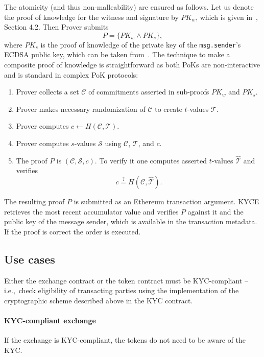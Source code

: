 The atomicity (and thus non-malleability) are ensured as follows. Let us denote the
proof of knowledge for the witness and signature by $PK_w$, which is given in~\cite{Camenisch2009}, Section 4.2. Then Prover submits 
$$
P = \{PK_w \wedge PK_s\},
$$
where $PK_s$ is the proof of knowledge of the private key of the \texttt{msg.sender}'s ECDSA public key, which can be taken from~\cite{Chase2016}. The technique to make a composite proof of knowledge is straightforward as both PoKs are non-interactive and is standard in complex PoK protocols:
\begin{enumerate}
	\item Prover collects a set $\mathcal{C}$ of commitments 
	asserted in sub-proofs $PK_w$ and $PK_s$.
	\item Prover makes necessary randomization of $\mathcal{C}$ to create $t$-values $\mathcal{T}$.
	\item Prover computes $c \leftarrow H(\mathcal{C},\mathcal{T})$.
	\item Prover computes $s$-values  $\mathcal{S}$ using
	$\mathcal{C}$,  $\mathcal{T}$, and $c$.
	\item The proof $P$ is $(\mathcal{C}, \mathcal{S},c)$.
	To verify it one computes asserted $t$-values $\widehat{\mathcal{T}}$ and verifies
	$$
	c\overset{?}{=}H(\mathcal{C},\widehat{\mathcal{T}}).
	$$
\end{enumerate}

The resulting proof $P$ is submitted as an Ethereum transaction argument.
KYCE retrieves the most recent accumulator value and verifies $P$ against it and the public key of the message sender, which is available in the transaction metadata.
If the proof is correct the order is executed.


\subsection{Use cases}

Either the exchange contract or the token contract must be KYC-compliant -- i.e.,~check eligibility of transacting parties using the implementation of the cryptographic scheme described above in the KYC contract.

\paragraph{KYC-compliant exchange}

If the exchange is KYC-compliant, the tokens do not need to be aware of the KYC.

